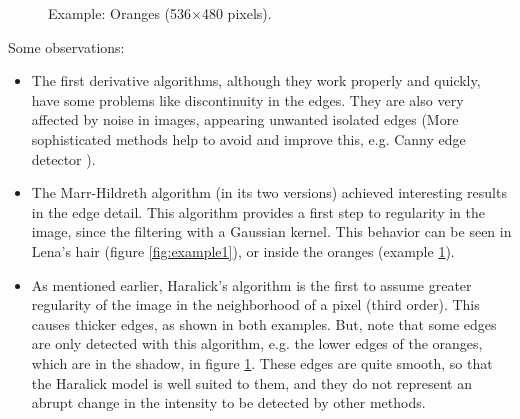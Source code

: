 \documentclass{ipol}
\numberwithin{equation}{section}
\numberwithin{table}{section}
\numberwithin{figure}{section}
\begin{document}
\begin{figure}[t!]
	\quad
	\quad
	\caption{Example: Oranges (536$\times$480 pixels).}
	\label{fig:example2}
\end{figure}

Some observations: 
\begin{itemize}
	\item The first derivative algorithms, although they work properly and quickly, have some problems like discontinuity in the edges. They are also very affected by noise in images, appearing unwanted isolated edges (More sophisticated methods help to avoid and improve this, e.g. Canny edge detector \cite{Canny1986}). \\
	\item The Marr-Hildreth algorithm (in its two versions) achieved interesting results in the edge detail. This algorithm provides a first step to regularity in the image, since the filtering with a Gaussian kernel. This behavior can be seen in Lena's hair (figure \ref{fig:example1}), or inside the oranges (example \ref{fig:example2}). \\
	\item As mentioned earlier, Haralick's algorithm is the first to assume greater regularity of the image in the neighborhood of a pixel (third order). This causes thicker edges, as shown in both examples. But, note that some edges are only detected with this algorithm, e.g. the lower edges of the oranges, which are in the shadow, in figure \ref{fig:example2}. These edges are quite smooth, so that the Haralick model is well suited to them, and they do not represent an abrupt change in the intensity to be detected by other methods. \\
\end{itemize}
\end{document}
